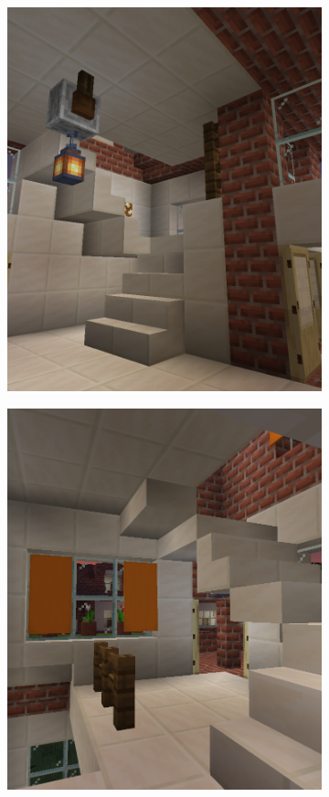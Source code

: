 \documentclass[
oneside,
fontsize=11pt
]{scrartcl}
\begin{document}
\begin{figure}[ht]
\begin{subfigure}[t]{0.3\textwidth}
      \includegraphics[width=\textwidth]{images/interior/entrance-stairs.png}
  \end{subfigure}
  \hfill
  \begin{subfigure}[t]{0.3\textwidth}
      \includegraphics[width=\textwidth]{images/interior/entrance-upper-stairs.png}
  \end{subfigure}
  

\end{figure}
\end{document}
